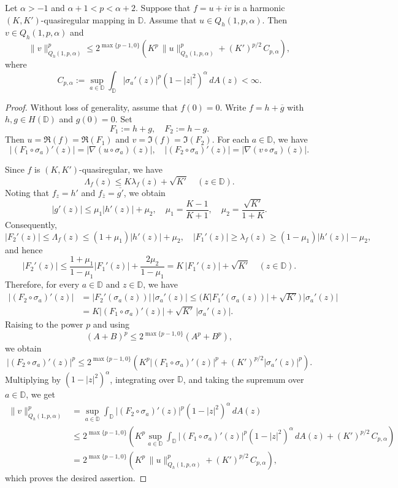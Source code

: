 \documentclass[10pt,a4paper]{amsart}
\begin{document}
\begin{theorem}\label{thm:Qh-CK21}
Let $\alpha>-1$ and $\alpha+1<p<\alpha+2$. Suppose that $f=u+iv$ is a harmonic $(K,K')$-quasiregular mapping in $\mathbb D$. Assume that $u\in Q_h(1,p,\alpha)$. Then $v\in Q_h(1,p,\alpha)$ and
\[
\|v\|_{Q_h(1,p,\alpha)}^{p}\le 2^{\max\{p-1,0\}}
\left(K^{p}\,\|u\|_{Q_h(1,p,\alpha)}^{p}+(K')^{p/2}\,C_{p,\alpha}\right),
\]
where
\[
C_{p,\alpha}:=\sup_{a\in\mathbb D}\int_{\mathbb D}|\sigma_a'(z)|^{p}(1-|z|^{2})^{\alpha}\,dA(z)<\infty.
\]
\end{theorem}

\begin{proof}
Without loss of generality, assume that $f(0)=0$. Write $f=h+\overline g$ with $h,g\in H(\mathbb D)$ and $g(0)=0$. Set
\[
F_1:=h+g,\quad F_2:=h-g.
\]
Then $u=\Re(f)=\Re(F_1)$ and $v=\Im(f)=\Im(F_2)$. For each $a\in\mathbb D$, we have
\[
|(F_1\circ\sigma_a)'(z)|=|\nabla(u\circ\sigma_a)(z)|,\quad |(F_2\circ\sigma_a)'(z)|=|\nabla(v\circ\sigma_a)(z)|.
\]

Since $f$ is $(K,K')$-quasiregular, we have
\[
\Lambda_f(z)\le K\lambda_f(z)+\sqrt{K'}\quad (z\in\mathbb D).
\]
Noting that $f_z=h'$ and $f_{\bar z}=\overline{g'}$, we obtain
\[
|g'(z)|\le \mu_1 |h'(z)|+\mu_2,\quad 
\mu_1=\frac{K-1}{K+1},\quad \mu_2=\frac{\sqrt{K'}}{1+K}.
\]
Consequently,
\[
|F_2'(z)|\le \Lambda_f(z)\le (1+\mu_1)|h'(z)|+\mu_2,
\quad
|F_1'(z)|\ge \lambda_f(z)\ge (1-\mu_1)|h'(z)|-\mu_2,
\]
and hence
\[
|F_2'(z)|\le \frac{1+\mu_1}{1-\mu_1}|F_1'(z)|+\frac{2\mu_2}{1-\mu_1}
=K\,|F_1'(z)|+\sqrt{K'}\quad (z\in\mathbb D).
\]
Therefore, for every $a\in\mathbb D$ and $z\in\mathbb D$, we have
\begin{align*}
|(F_2\circ\sigma_a)'(z)|
&=|F_2'(\sigma_a(z))|\,|\sigma_a'(z)|
\le \bigl(K|F_1'(\sigma_a(z))|+\sqrt{K'}\bigr)\,|\sigma_a'(z)|  \\
&=K|(F_1\circ\sigma_a)'(z)|+\sqrt{K'}\,|\sigma_a'(z)|.
\end{align*}
Raising to the power $p$ and using $$(A+B)^p\le 2^{\max\{p-1,0\}}(A^p+B^p),$$ we obtain
\[
|(F_2\circ\sigma_a)'(z)|^{p}
\le 2^{\max\{p-1,0\}}
\left(
K^{p}|(F_1\circ\sigma_a)'(z)|^{p}
+(K')^{p/2}|\sigma_a'(z)|^{p}
\right).
\]
Multiplying by $(1-|z|^{2})^{\alpha}$, integrating over $\mathbb D$, and taking the supremum over $a\in\mathbb D$, we get
\begin{align*}
\|v\|_{Q_h(1,p,\alpha)}^{p}
&=\sup_{a\in\mathbb D}\int_{\mathbb D}|(F_2\circ\sigma_a)'(z)|^{p}(1-|z|^{2})^{\alpha}\,dA(z)\\
&\le 2^{\max\{p-1,0\}}
\left(
K^{p}\sup_{a\in\mathbb D}\int_{\mathbb D}|(F_1\circ\sigma_a)'(z)|^{p}(1-|z|^{2})^{\alpha}\,dA(z)
+(K')^{p/2}\,C_{p,\alpha}
\right)\\
&=2^{\max\{p-1,0\}}
\left(
K^{p}\,\|u\|_{Q_h(1,p,\alpha)}^{p}+(K')^{p/2}\,C_{p,\alpha}
\right),
\end{align*}
which proves the desired assertion.
\end{proof}
\end{document}
